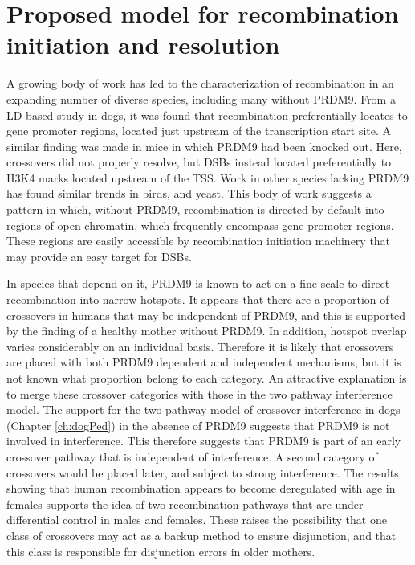 \section{Proposed model for recombination initiation and resolution}

A growing body of work has led to the characterization of recombination in an expanding number of diverse species, including many without PRDM9.
From a LD based study in dogs, it was found that recombination preferentially locates to gene promoter regions, located just upstream of the transcription start site\cite{Auton2013}.
A similar finding was made in mice in which PRDM9 had been knocked out\cite{Brick2012}.
Here, crossovers did not properly resolve, but DSBs instead located preferentially to H3K4 marks located upstream of the TSS.
Work in other species lacking PRDM9 has found similar trends in birds\cite{Singhal2015}, and yeast\cite{Lam2015,Nicolas1989}.
This body of work suggests a pattern in which, without PRDM9, recombination is directed by default into regions of open chromatin, which frequently encompass gene promoter regions.
These regions are easily accessible by recombination initiation machinery that may provide an easy target for DSBs.

In species that depend on it, PRDM9 is known to act on a fine scale to direct recombination into narrow hotspots.
It appears that there are a proportion of crossovers in humans that may be independent of PRDM9, and this is supported by the finding of a healthy mother without PRDM9\cite{Narasimhan2016}.
In addition, hotspot overlap varies considerably on an individual basis\cite{Coop2008,Campbell2015}.
Therefore it is likely that crossovers are placed with both PRDM9 dependent and independent mechanisms, but it is not known what proportion belong to each category.
An attractive explanation is to merge these crossover categories with those in the two pathway interference model.
The support for the two pathway model of crossover interference in dogs (Chapter \ref{ch:dogPed}) in the absence of PRDM9 suggests that PRDM9 is not involved in interference.
This therefore suggests that PRDM9 is part of an early crossover pathway that is independent of interference.
A second category of crossovers would be placed later, and subject to strong interference.
The results showing that human recombination appears to become deregulated with age in females supports the idea of two recombination pathways that are under differential control in males and females.
These raises the possibility that one class of crossovers may act as a backup method to ensure disjunction, and that this class is responsible for disjunction errors in older mothers.

